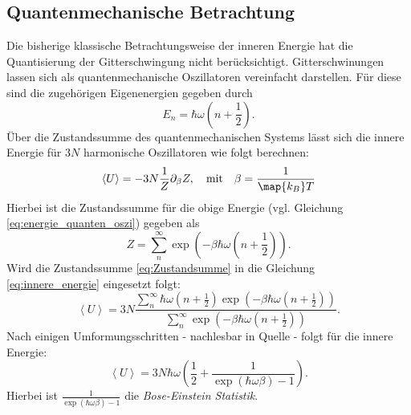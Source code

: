\subsection{Quantenmechanische Betrachtung}
Die bisherige klassische Betrachtungsweise der inneren Energie hat die
Quantisierung der Gitterschwingung nicht berücksichtigt.
Gitterschwinungen lassen sich als quantenmechanische Oszillatoren vereinfacht darstellen. Für diese
sind die zugehörigen Eigenenergien gegeben durch
\begin{equation}
  \label{eq:energie_quanten_oszi}
  E_n = \hbar \omega \left(n + \frac{1}{2}\right).
\end{equation}
Über die Zustandssumme des quantenmechanischen Systems lässt sich die innere Energie
für $3N$ harmonische Oszillatoren wie folgt berechnen:
\begin{equation}
  \label{eq:innere_energie}
  \left<U\right> = -3N\frac{1}{Z}\partial_\beta Z, \quad \text{mit} \quad \beta = \frac{1}{\map{k_B}T}
\end{equation}
Hierbei ist die Zustandssumme für die obige Energie (vgl. Gleichung \eqref{eq:energie_quanten_oszi})
gegeben als
\begin{equation}
  \label{eq:Zustandsumme}
  Z = \sum_n^\infty \exp\left(-\beta\hbar\omega\left(n+\frac{1}{2}\right)\right).
\end{equation}
Wird die Zustandssumme \eqref{eq:Zustandsumme} in die Gleichung \eqref{eq:innere_energie}
eingesetzt folgt:
\begin{equation*}
  \left<U\right>= 3N  \frac{ \sum_n^\infty \hbar\omega\left( n+ \frac{1}{2} \right)\exp\left(-\beta\hbar\omega\left( n+\frac{1}{2} \right) \right) }{ \sum_n^\infty \exp\left( -\beta\hbar\omega\left( n+\frac{1}{2} \right) \right)}.
\end{equation*}
Nach einigen Umformungsschritten - nachlesbar in Quelle \cite[S. 220]{marx} - folgt für die innere Energie:
\begin{equation}
  \label{eq:innere_Energie_Quantenmechanik_diskrete}
  \left<U\right> = 3N\hbar\omega\left(\frac{1}{2} + \frac{1}{\exp\left(\hbar\omega\beta\right) -1}\right).
\end{equation}
Hierbei ist $\frac{1}{\exp\left(\hbar\omega\beta\right) -1}$ die \emph{Bose-Einstein Statistik}.

